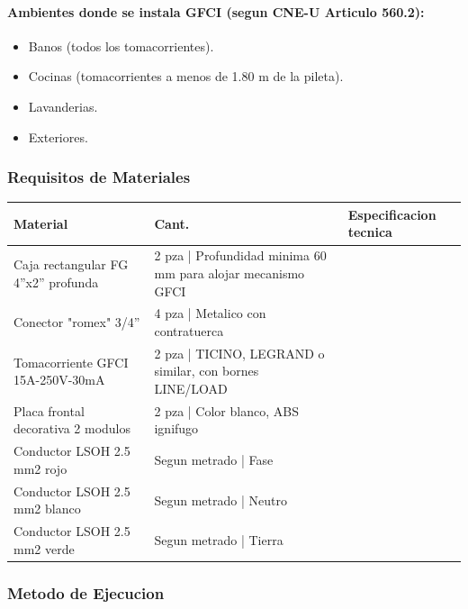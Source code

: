 \paragraph{Ambientes donde se instala GFCI (segun CNE-U Articulo 560.2):}
\begin{itemize}[nosep]
  \item Banos (todos los tomacorrientes).
  \item Cocinas (tomacorrientes a menos de 1.80 m de la pileta).
  \item Lavanderias.
  \item Exteriores.
\end{itemize}

\subsubsection{Requisitos de Materiales}

\begin{longtable}{L{5.0cm} L{2.0cm} L{7.5cm}}
\toprule
\textbf{Material} & \textbf{Cant.} & \textbf{Especificacion tecnica} \\
\midrule
Caja rectangular FG 4''x2'' profunda & 2 pza | Profundidad minima 60 mm para alojar mecanismo GFCI \\
Conector "romex" 3/4'' & 4 pza | Metalico con contratuerca \\
Tomacorriente GFCI 15A-250V-30mA & 2 pza | TICINO, LEGRAND o similar, con bornes LINE/LOAD \\
Placa frontal decorativa 2 modulos & 2 pza | Color blanco, ABS ignifugo \\
Conductor LSOH 2.5 mm2 rojo & Segun metrado | Fase \\
Conductor LSOH 2.5 mm2 blanco & Segun metrado | Neutro \\
Conductor LSOH 2.5 mm2 verde & Segun metrado | Tierra \\
\bottomrule
\end{longtable}

\subsubsection{Metodo de Ejecucion}

